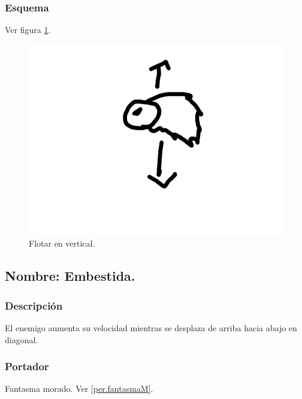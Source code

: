 \documentclass[11pt,letterpaper]{article}
\begin{document}
		\subsubsection{Esquema}
		Ver figura \ref{fig:flotarV}.
		\begin{figure}
			\centering
			\includegraphics[height=0.2 \textheight]{Imagenes/flotarV}
			\caption{Flotar en vertical.}
			\label{fig:flotarV}
		\end{figure}
	\subsection{Nombre: Embestida.} \label{hab.embestida}
		\subsubsection{Descripción}
		El enemigo aumenta su velocidad mientras se desplaza de arriba hacia abajo en diagonal.
		\subsubsection{Portador}
		Fantasma morado. Ver \ref{per.fantasmaM}.
\end{document}
